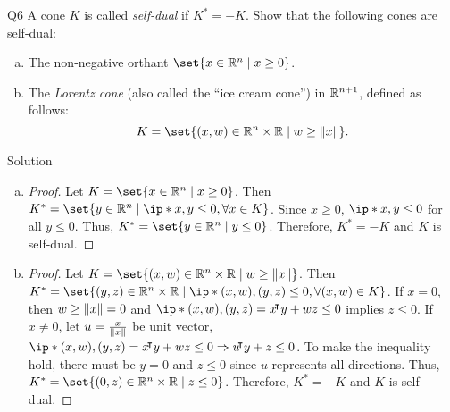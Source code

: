 \documentclass{article}
\begin{document}
\begin{problem}
    {Q6}
    A cone $K$ is called \textit{self-dual} if $K^*=-K$. Show that the following cones are self-dual:
    \begin{enumerate}[(a)]
        \item The non-negative orthant $\set{x\in\R^n\mid x\geq 0}$.
        \item The \textit{Lorentz cone} (also called the ``ice cream cone'') in $\mathbb{R}^{n+1}$, defined as follows: \[K=\set{(x,w)\in \R^n\times\R\mid w\geq\norm{x}}.\]
    \end{enumerate}
\end{problem}

\begin{solution}
    {Solution}
    \begin{enumerate}[(a)]
        \item {
            \begin{proof}
                Let $K=\set{x\in\R^n\mid x\geq 0}$. Then $K^*=\set{y\in\R^n\mid \ip*{x,y}\leq 0, \forall x\in K}$. Since $x\geq 0$, $\ip*{x,y}\leq 0$ for all $y\leq 0$. Thus, $K^*=\set{y\in\R^n\mid y\leq 0}$. Therefore, $K^*=-K$ and $K$ is self-dual.
            \end{proof}
        }
        \item {
            \begin{proof}
                Let $K=\set{(x,w)\in \R^n\times\R\mid w\geq\norm{x}}$. Then $K^*=\set{(y,z)\in \R^n\times\R\mid \ip*{(x,w),(y,z)}\leq 0, \forall (x,w)\in K}$. If $x=0$, then $w\geq \lVert x\rVert=0$ and $\ip*{(x,w),(y,z)} = x\trn y+wz \leq 0$ implies $z\leq 0$. If $x\neq 0$, let $u=\frac{x}{\lVert x\rVert}$ be unit vector, $\ip*{(x,w),(y,z)} = x\trn y+wz \leq 0 \Rightarrow u\trn y+z\leq 0$. To make the inequality hold, there must be $y=0$ and $z\leq 0$ since $u$ represents all directions. Thus, $K^*=\set{(0,z)\in \R^n\times\R\mid z\leq 0}$. Therefore, $K^*=-K$ and $K$ is self-dual.
            \end{proof}
        }
    \end{enumerate}
\end{solution}
\end{document}
